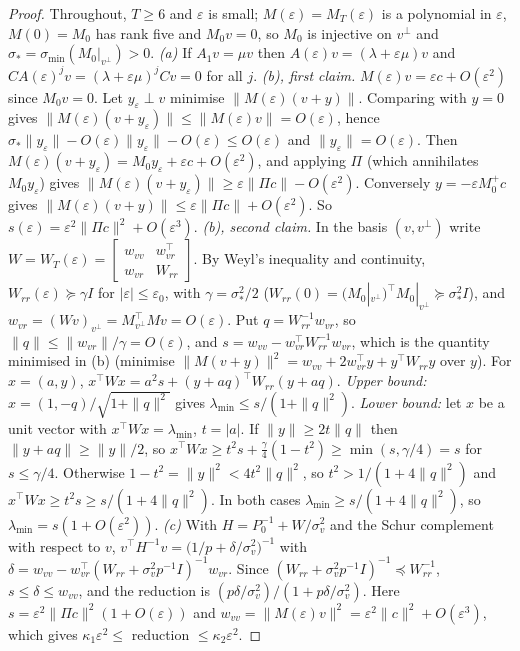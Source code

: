 \documentclass[conference]{IEEEtran}
\begin{document}
\begin{proof} Throughout, $T\ge6$ and $\varepsilon$ is small; $M(\varepsilon)=M_T(\varepsilon)$ is a polynomial in $\varepsilon$, $M(0)=M_0$ has rank five and $M_0v=0$, so $M_0$ is injective on $v^\perp$ and $\sigma_*=\sigma_{\min}(M_0|_{v^\perp})>0$.
\emph{(a)} If $A_1v=\mu v$ then $A(\varepsilon)v=(\lambda+\varepsilon\mu)v$ and $CA(\varepsilon)^jv=(\lambda+\varepsilon\mu)^jCv=0$ for all $j$.
\emph{(b), first claim.} $M(\varepsilon)v=\varepsilon c+O(\varepsilon^2)$ since $M_0v=0$. Let $y_\varepsilon\perp v$ minimise $\|M(\varepsilon)(v+y)\|$. Comparing with $y=0$ gives $\|M(\varepsilon)(v+y_\varepsilon)\|\le\|M(\varepsilon)v\|=O(\varepsilon)$, hence $\sigma_*\|y_\varepsilon\|-O(\varepsilon)\|y_\varepsilon\|-O(\varepsilon)\le O(\varepsilon)$ and $\|y_\varepsilon\|=O(\varepsilon)$. Then $M(\varepsilon)(v+y_\varepsilon)=M_0y_\varepsilon+\varepsilon c+O(\varepsilon^2)$, and applying $\Pi$ (which annihilates $M_0y_\varepsilon$) gives $\|M(\varepsilon)(v+y_\varepsilon)\|\ge\varepsilon\|\Pi c\|-O(\varepsilon^2)$. Conversely $y=-\varepsilon M_0^{+}c$ gives $\|M(\varepsilon)(v+y)\|\le\varepsilon\|\Pi c\|+O(\varepsilon^2)$. So $s(\varepsilon)=\varepsilon^2\|\Pi c\|^2+O(\varepsilon^3)$.
\emph{(b), second claim.} In the basis $(v,v^\perp)$ write $W=W_T(\varepsilon)=\begin{bmatrix}w_{vv}&w_{vr}^\top\\w_{vr}&W_{rr}\end{bmatrix}$. By Weyl's inequality and continuity, $W_{rr}(\varepsilon)\succeq\gamma I$ for $|\varepsilon|\le\varepsilon_0$, with $\gamma=\sigma_*^2/2$ ($W_{rr}(0)=(M_0|_{v^\perp})^\top M_0|_{v^\perp}\succeq\sigma_*^2I$), and $w_{vr}=(Wv)_{v^\perp}=M_{v^\perp}^\top M v=O(\varepsilon)$. Put $q=W_{rr}^{-1}w_{vr}$, so $\|q\|\le\|w_{vr}\|/\gamma=O(\varepsilon)$, and $s=w_{vv}-w_{vr}^\top W_{rr}^{-1}w_{vr}$, which is the quantity minimised in (b) (minimise $\|M(v+y)\|^2=w_{vv}+2w_{vr}^\top y+y^\top W_{rr}y$ over $y$). For $x=(a,y)$, $x^\top Wx=a^2s+(y+aq)^\top W_{rr}(y+aq)$. \emph{Upper bound:} $x=(1,-q)/\sqrt{1+\|q\|^2}$ gives $\lambda_{\min}\le s/(1+\|q\|^2)$. \emph{Lower bound:} let $x$ be a unit vector with $x^\top Wx=\lambda_{\min}$, $t=|a|$. If $\|y\|\ge2t\|q\|$ then $\|y+aq\|\ge\|y\|/2$, so $x^\top Wx\ge t^2s+\tfrac{\gamma}{4}(1-t^2)\ge\min(s,\gamma/4)=s$ for $s\le\gamma/4$. Otherwise $1-t^2=\|y\|^2<4t^2\|q\|^2$, so $t^2>1/(1+4\|q\|^2)$ and $x^\top Wx\ge t^2s\ge s/(1+4\|q\|^2)$. In both cases $\lambda_{\min}\ge s/(1+4\|q\|^2)$, so $\lambda_{\min}=s(1+O(\varepsilon^2))$.
\emph{(c)} With $H=P_0^{-1}+W/\sigma_v^2$ and the Schur complement with respect to $v$, $v^\top H^{-1}v=\big(1/p+\delta/\sigma_v^2\big)^{-1}$ with $\delta=w_{vv}-w_{vr}^\top(W_{rr}+\sigma_v^2p^{-1}I)^{-1}w_{vr}$. Since $(W_{rr}+\sigma_v^2p^{-1}I)^{-1}\preceq W_{rr}^{-1}$, $s\le\delta\le w_{vv}$, and the reduction is $(p\delta/\sigma_v^2)/(1+p\delta/\sigma_v^2)$. Here $s=\varepsilon^2\|\Pi c\|^2(1+O(\varepsilon))$ and $w_{vv}=\|M(\varepsilon)v\|^2=\varepsilon^2\|c\|^2+O(\varepsilon^3)$, which gives $\kappa_1\varepsilon^2\le$ reduction $\le\kappa_2\varepsilon^2$.

\end{proof}
\end{document}
